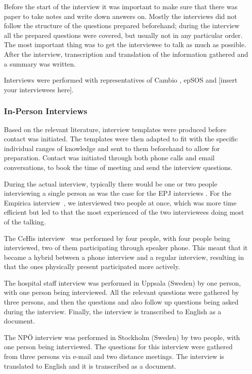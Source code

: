 \documentclass[14pt]{article}
\begin{document}
Before the start of the interview it was important to make sure that there was paper to take notes and write down answers on. Mostly the interviews did not follow the structure of the questions prepared beforehand; during the interview all the prepared questions were covered, but usually not in any particular order. The most important thing was to get the interviewee to talk as much as possible. After the interview, transcription and translation of the information gathered and a summary was written.

Interviews were performed with representatives of Cambio \cite{Cambio}, epSOS \cite{epSOS} and [insert your interviewees here].

\subsubsection{In-Person Interviews}

Based on the relevant literature, interview templates were produced before contact was initiated. The templates were then adapted to fit with the specific individual ranges of knowledge and sent to them beforehand to allow for preparation. Contact was initiated through both phone calls and email conversations, to book the time of meeting and send the interview questions.

During the actual interview, typically there would be one or two people interviewing a single person as was the case for the EPJ interviews \cite{EPJ1} \cite{EPJ2}. For the Empirica interview~\cite{Empirica}, we interviewed two people at once, which was more time efficient but led to that the most experienced of the two interviewees doing most of the talking.

The CeHis interview~\cite{CeHis} was performed by four people, with four people being interviewed, two of them participating through speaker phone. This meant that it became a hybrid between a phone interview and a regular interview, resulting in that the ones physically present participated more actively.

The hospital staff interview \cite{FarzinYazdi} was performed in Uppsala (Sweden) by one person, with one person being interviewed. All the relevant questions were gathered by three persons, and then the questions and also follow up questions being asked during the interview. Finally, the interview is transcribed to English as a document. 

The NPÖ interview \cite{ViktorJernelov} was performed in Stockholm (Sweden) by two people, with one person being interviewed. The questions for this interview were gathered from three persons via e-mail and two distance meetings. The interview is translated to English and it is transcribed as a document.
\end{document}
